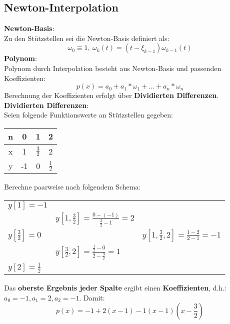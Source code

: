 \documentclass[10pt,a4paper]{article}
\begin{document}
	\subsection{Newton-Interpolation}
	\textbf{Newton-Basis}:\\Zu den Stützstellen sei die Newton-Basis definiert als: $$\omega_0 \equiv 1,\ \omega_k(t) = (t - \xi_{k-1})\omega_{k-1}(t)$$
	\textbf{Polynom}:\\Polynom durch Interpolation besteht aus Newton-Basis und passenden Koeffizienten: $$p(x) = a_0 + a_1 * \omega_1 + ... + a_n * \omega_n$$
	Berechnung der Koeffizienten erfolgt über \textbf{Dividierten Differenzen}.
	\newpage
	\noindent\textbf{Dividierten Differenzen}:\\
	Seien folgende Funktionswerte an Stützstellen gegeben:
	\begin{center}
		\begin{tabular}{c | c c c}
			n & 0 & 1 & 2\\
			\hline
			x & 1 & $\frac{3}{2}$ & 2\\
			y & -1 & 0 & $\frac{1}{2}$
		\end{tabular}
	\end{center}
	Berechne paarweise nach folgendem Schema:
	\begin{center}
		\begin{tabular}{l l l}
			$y[1] = -1$ 				&																		&\\
										& $y[1, \frac{3}{2}] = \frac{0 - (-1)}{\frac{3}{2} - 1} = 2$ 			&\\
			$y[\frac{3}{2}] = 0$		& 																		& $y[1, \frac{3}{2}, 2] = \frac{1 - 2}{2 - 1} = -1$\\
										& $y[\frac{3}{2}, 2] = \frac{\frac{1}{2} - 0}{2 - \frac{3}{2}} = 1$		&\\
			$y[2] = \frac{1}{2}$		&																		&
		\end{tabular}
	\end{center}
	Das \textbf{oberste Ergebnis jeder Spalte} ergibt einen \textbf{Koeffizienten}, d.h.: $a_0 = -1, a_1 = 2, a_2 = -1$. Damit:
	$$p(x) = -1 + 2(x - 1) -1(x - 1)(x - \frac{3}{2})$$
\end{document}
